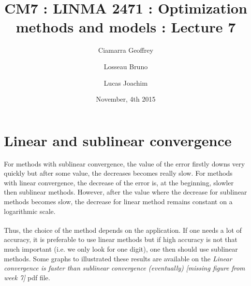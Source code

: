 \documentclass[10pt,a4paper]{article}
\title{CM7 : LINMA 2471 : Optimization methods and models : Lecture 7}
\date{November, 4th 2015}
\author{Ciamarra Geoffrey \and Losseau Bruno \and Lucas Joachim}
\begin{document}
\maketitle

\theoremstyle{plain}
\newtheorem{theorem}{Theorem}[section] %
\newtheorem{definition}{Definition}[section] %
\newtheorem{example}{Example}[section] %

\newtheorem{proposition}{Proposition}[section]
\newtheorem{corollary}{Corollary}[section]
\newtheorem{remark}{Remark}[section]




\section{Linear and sublinear convergence}
 For methods with sublinear convergence, the value of the error firstly downs very quickly but after some value, the decreases becomes really slow. For methods with linear convergence, the decrease of the error is, at the beginning, slowler then sublinear methods. However, after the value where the decrease for sublinear methods becomes slow, the decrease for linear method remains constant on a logarithmic scale. \\ \\ Thus, the choice of the method depends on the application. If one needs a lot of accuracy, it is preferable to use linear methods but if high accuracy is not that much important (i.e. we only look for one digit), one then should use sublinear methods. Some graphs to illustrated these results are available on the \textit{Linear convergence is faster than sublinear convergence (eventually) [missing figure from week 7]} pdf file.  
\end{document}
